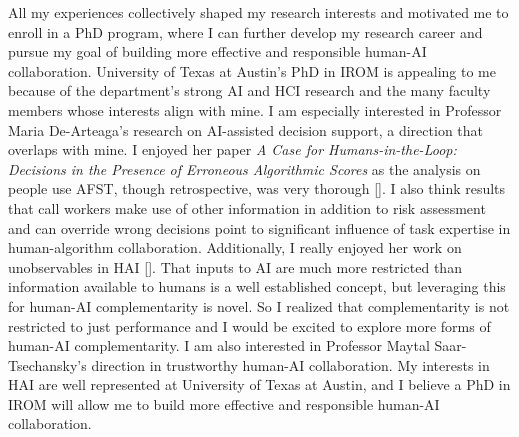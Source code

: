 


All my experiences collectively shaped my research interests and motivated me to enroll in a PhD program, where I can further develop my research career and pursue my goal of building more effective and responsible human-AI collaboration. 
University of Texas at Austin's PhD in IROM is appealing to me because of the department's strong AI and HCI research and the many faculty members whose interests align with mine.
I am especially interested in Professor Maria De-Arteaga's research on AI-assisted decision support, a direction that overlaps with mine. I enjoyed her paper \textit{A Case for Humans-in-the-Loop: Decisions in the Presence
of Erroneous Algorithmic Scores} as the analysis on people use AFST, though retrospective, was very thorough []. I also think results that call workers make use of other information in addition to risk assessment and can override wrong decisions point to significant influence of task expertise in human-algorithm collaboration. Additionally, I really enjoyed her work on unobservables in HAI []. That inputs to AI are much more restricted than information available to humans is a well established concept, but leveraging this for human-AI complementarity is novel. So I realized that complementarity is not restricted to just performance and I would be excited to explore more forms of human-AI complementarity.
I am also interested in Professor Maytal Saar-Tsechansky's direction in trustworthy human-AI collaboration. 
My interests in HAI are well represented at University of Texas at Austin, and I believe a PhD in IROM will allow me to build more effective and responsible human-AI collaboration.